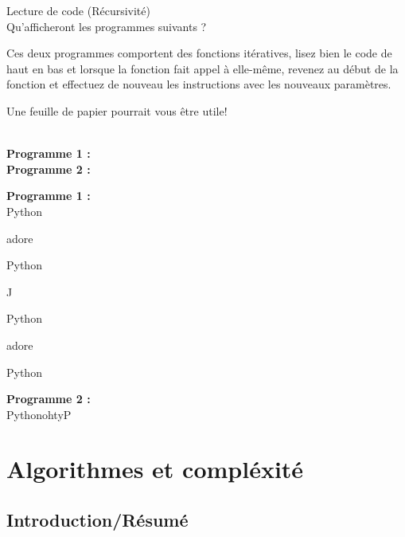 \begin{Exercice}[5 min] Lecture de code (Récursivité)\\

Qu'afficheront les programmes suivants ? \\

\begin{conseil}
   Ces deux programmes comportent des fonctions itératives, lisez bien le code de haut en bas et lorsque la fonction fait appel à elle-même, revenez au début de la fonction et effectuez de nouveau les instructions avec les nouveaux paramètres.
   
   Une feuille de papier pourrait vous être utile!\\
\end{conseil}

\textbf{\\Programme 1 :} \\

	 

\textbf{Programme 2 :} \\

	

    
\begin{solution}
\textbf{Programme 1 :} \\

    Python
    
	adore
	
	Python
	
	J
	
	Python
	
	adore
	
	Python

    
\end{solution}


\begin{solution}   
\textbf{Programme 2 :} \\

    PythonohtyP
    
\end{solution}

\end{Exercice}

\section{Algorithmes et compléxité}

\subsection{Introduction/Résumé}

